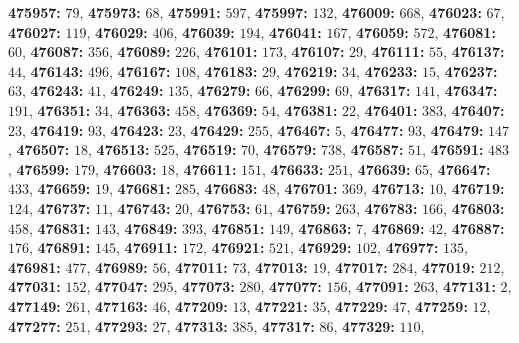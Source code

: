 \textsf{\bfseries 475957:} $79$, \textsf{\bfseries 475973:} $68$, \textsf{\bfseries 475991:} $597$, \textsf{\bfseries 475997:} $132$, \textsf{\bfseries 476009:} $668$, \textsf{\bfseries 476023:} $67$, \textsf{\bfseries 476027:} $119$, \textsf{\bfseries 476029:} $406$, \textsf{\bfseries 476039:} $194$, \textsf{\bfseries 476041:} $167$, \textsf{\bfseries 476059:} $572$, \textsf{\bfseries 476081:} $60$, \textsf{\bfseries 476087:} $356$, \textsf{\bfseries 476089:} $226$, \textsf{\bfseries 476101:} $173$, \textsf{\bfseries 476107:} $29$, \textsf{\bfseries 476111:} $55$, \textsf{\bfseries 476137:} $44$, \textsf{\bfseries 476143:} $496$, \textsf{\bfseries 476167:} $108$, \textsf{\bfseries 476183:} $29$, \textsf{\bfseries 476219:} $34$, \textsf{\bfseries 476233:} $15$, \textsf{\bfseries 476237:} $63$, \textsf{\bfseries 476243:} $41$, \textsf{\bfseries 476249:} $135$, \textsf{\bfseries 476279:} $66$, \textsf{\bfseries 476299:} $69$, \textsf{\bfseries 476317:} $141$, \textsf{\bfseries 476347:} $191$, \textsf{\bfseries 476351:} $34$, \textsf{\bfseries 476363:} $458$, \textsf{\bfseries 476369:} $54$, \textsf{\bfseries 476381:} $22$, \textsf{\bfseries 476401:} $383$, \textsf{\bfseries 476407:} $23$, \textsf{\bfseries 476419:} $93$, \textsf{\bfseries 476423:} $23$, \textsf{\bfseries 476429:} $255$, \textsf{\bfseries 476467:} $5$, \textsf{\bfseries 476477:} $93$, \textsf{\bfseries 476479:} $147$, \textsf{\bfseries 476507:} $18$, \textsf{\bfseries 476513:} $525$, \textsf{\bfseries 476519:} $70$, \textsf{\bfseries 476579:} $738$, \textsf{\bfseries 476587:} $51$, \textsf{\bfseries 476591:} $483$, \textsf{\bfseries 476599:} $179$, \textsf{\bfseries 476603:} $18$, \textsf{\bfseries 476611:} $151$, \textsf{\bfseries 476633:} $251$, \textsf{\bfseries 476639:} $65$, \textsf{\bfseries 476647:} $433$, \textsf{\bfseries 476659:} $19$, \textsf{\bfseries 476681:} $285$, \textsf{\bfseries 476683:} $48$, \textsf{\bfseries 476701:} $369$, \textsf{\bfseries 476713:} $10$, \textsf{\bfseries 476719:} $124$, \textsf{\bfseries 476737:} $11$, \textsf{\bfseries 476743:} $20$, \textsf{\bfseries 476753:} $61$, \textsf{\bfseries 476759:} $263$, \textsf{\bfseries 476783:} $166$, \textsf{\bfseries 476803:} $458$, \textsf{\bfseries 476831:} $143$, \textsf{\bfseries 476849:} $393$, \textsf{\bfseries 476851:} $149$, \textsf{\bfseries 476863:} $7$, \textsf{\bfseries 476869:} $42$, \textsf{\bfseries 476887:} $176$, \textsf{\bfseries 476891:} $145$, \textsf{\bfseries 476911:} $172$, \textsf{\bfseries 476921:} $521$, \textsf{\bfseries 476929:} $102$, \textsf{\bfseries 476977:} $135$, \textsf{\bfseries 476981:} $477$, \textsf{\bfseries 476989:} $56$, \textsf{\bfseries 477011:} $73$, \textsf{\bfseries 477013:} $19$, \textsf{\bfseries 477017:} $284$, \textsf{\bfseries 477019:} $212$, \textsf{\bfseries 477031:} $152$, \textsf{\bfseries 477047:} $295$, \textsf{\bfseries 477073:} $280$, \textsf{\bfseries 477077:} $156$, \textsf{\bfseries 477091:} $263$, \textsf{\bfseries 477131:} $2$, \textsf{\bfseries 477149:} $261$, \textsf{\bfseries 477163:} $46$, \textsf{\bfseries 477209:} $13$, \textsf{\bfseries 477221:} $35$, \textsf{\bfseries 477229:} $47$, \textsf{\bfseries 477259:} $12$, \textsf{\bfseries 477277:} $251$, \textsf{\bfseries 477293:} $27$, \textsf{\bfseries 477313:} $385$, \textsf{\bfseries 477317:} $86$, \textsf{\bfseries 477329:} $110$, 
